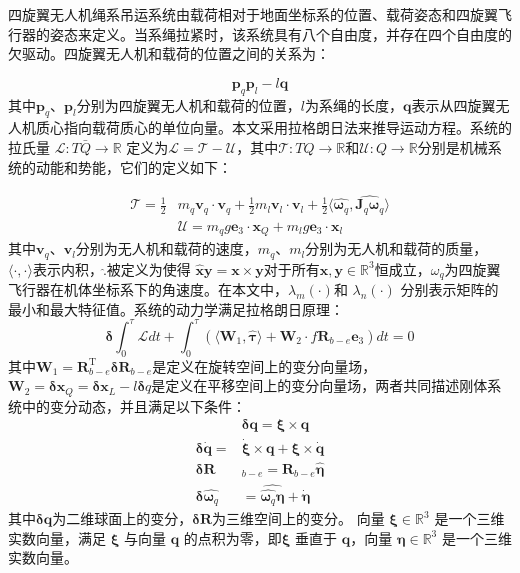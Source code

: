 \documentclass[lang=chs, degree=master, blindreview=false, winfonts=true]{yanputhesis}
\begin{document}
四旋翼无人机绳系吊运系统由载荷相对于地面坐标系的位置、载荷姿态和四旋翼飞行器的姿态来定义。当系绳拉紧时，该系统具有八个自由度，并存在四个自由度的欠驱动。四旋翼无人机和载荷的位置之间的关系为：

\begin{equation}
	\bm p_q\bm p_l-l\bm q
\end{equation}
其中$\bm p_q$、$\bm p_l$分别为四旋翼无人机和载荷的位置，$l$为系绳的长度，$\bm q$表示从四旋翼无人机质心指向载荷质心的单位向量。本文采用拉格朗日法来推导运动方程。系统的拉氏量 $\mathcal{L}:T\bar{Q}\to\mathbb{R}$ 定义为$\mathcal{L}=\mathcal{T}-\mathcal{U}$，其中$\mathcal{T}:TQ\to\mathbb{R}$和${\mathcal{U}}:Q\to\mathbb{R}$分别是机械系统的动能和势能，它们的定义如下：

\begin{equation}
\begin{aligned}
	\mathcal{T}=\frac{1}{2}&m_{q}\bm v_{q}\cdot \bm v_{q}+\frac{1}{2}m_{l}\bm v_{l}\cdot \bm v_{l}+\frac{1}{2}\langle\hat{\bm  \omega_q},\widehat{\bm J_{q}\bm  \omega_q}\rangle\\
	&\mathcal{U}=m_{q}g\bm e_{3}\cdot \bm x_{Q}+m_{l}g\bm e_{3}\cdot \bm x_{l}
\end{aligned}
	\label{2-9}
\end{equation}
其中$\bm v_q$、$\bm v_l$分别为无人机和载荷的速度，$m_q$、$m_l$分别为无人机和载荷的质量，$\langle\cdot,\cdot\rangle $表示内积，$\hat{.}$被定义为使得 $\hat{\bm x}\bm y=\bm x\times \bm y$对于所有$\bm x,\bm y\in\mathbb{R}^3$恒成立，$\omega_q$为四旋翼飞行器在机体坐标系下的角速度。在本文中，$\lambda_m(\cdot)$和 $\lambda_n(\cdot)$ 分别表示矩阵的最小和最大特征值。系统的动力学满足拉格朗日原理：
\begin{equation}
	\bm \delta\int_0^\tau\mathcal{L} dt+\int_0^\tau\left(\langle \bm W_1,\hat{\bm \tau}\rangle+\bm W_2\cdot f\bm{R}_{b-e}\bm e_3\right) dt=0
	\label{2-10}
\end{equation}
其中$\bm W_{1}=\bm R_{b-e}^\mathrm{T}\bm \delta \bm R_{b-e}$是定义在旋转空间上的变分向量场， $ \bm W_{2}=\bm \delta \bm x_{Q}=\bm \delta \bm x_{L}-l\bm \delta q$是定义在平移空间上的变分向量场，两者共同描述刚体系统中的变分动态，并且满足以下条件：
\begin{equation}
	\begin{aligned}
	&\bm \delta \bm q = \bm \xi \times \bm q\\
	\bm \delta \dot{\bm q} = &\dot{\bm \xi} \times \bm q + \bm \xi \times \dot{\bm q} \\
	\bm \delta\bm  R&_{b-e} = \bm R_{b-e} \hat{\bm \eta} \\
	\bm \delta \hat{\bm  \omega _q}& = \widehat{\hat{\bm  \omega_q} \bm \eta} + \hat{\dot{\bm \eta}}
\end{aligned}
\end{equation}
其中$\bm \delta \bm q$为二维球面上的变分，$\bm \delta \bm R$为三维空间上的变分。
向量 $\bm{\xi} \in \mathbb{R}^3$ 是一个三维实数向量，满足 $\bm{\xi}$ 与向量 $\bm{q}$ 的点积为零，即$\bm{\xi}$ 垂直于 $\bm{q}$，向量 $\bm{\eta} \in \mathbb{R}^3$ 是一个三维实数向量。
\end{document}
